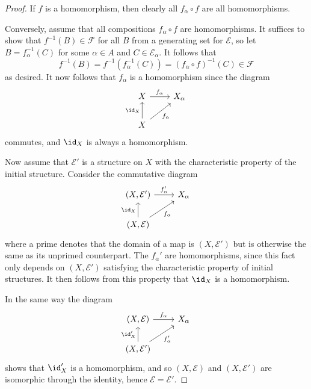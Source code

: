 \documentclass[article, a4paper, 11pt, oneside]{memoir}
\numberwithin{equation}{chapter}
\newcommand{\calE}{\mathcal{E}}
\newcommand{\calF}{\mathcal{F}}
\begin{document}
\begin{proof}
    If $f$ is a homomorphism, then clearly all $f_\alpha \circ f$ are all homomorphisms.

    Conversely, assume that all compositions $f_\alpha \circ f$ are homomorphisms. It suffices to show that $f^{-1}(B) \in \calF$ for all $B$ from a generating set for $\calE$, so let $B = f_\alpha^{-1}(C)$ for some $\alpha \in A$ and $C \in \calE_\alpha$. It follows that
    \begin{equation*}
        f^{-1}(B)
            = f^{-1}(f_\alpha^{-1}(C))
            = (f_\alpha \circ f)^{-1}(C)
            \in \calF
    \end{equation*}
    as desired. It now follows that $f_\alpha$ is a homomorphism since the diagram
    \begin{equation*}
        \begin{tikzcd}
            X
                \ar[r, "f_\alpha"]
            & X_\alpha \\
            X
                \ar[u, "\id_X"]
                \ar[ur, "f_\alpha", swap]
        \end{tikzcd}
    \end{equation*}
    commutes, and $\id_X$ is always a homomorphism.

    Now assume that $\calE'$ is a structure on $X$ with the characteristic property of the initial structure. Consider the commutative diagram
    \begin{equation*}
        \begin{tikzcd}
            (X,\calE')
                \ar[r, "f_\alpha'"]
            & X_\alpha \\
            (X,\calE)
                \ar[u, "\id_X"]
                \ar[ur, "f_\alpha", swap]
        \end{tikzcd}
    \end{equation*}
    where a prime denotes that the domain of a map is $(X,\calE')$ but is otherwise the same as its unprimed counterpart. The $f_\alpha'$ are homomorphisms, since this fact only depends on $(X,\calE')$ satisfying the characteristic property of initial structures. It then follows from this property that $\id_X$ is a homomorphism.

    In the same way the diagram
    \begin{equation*}
        \begin{tikzcd}
            (X,\calE)
                \ar[r, "f_\alpha"]
            & X_\alpha \\
            (X,\calE')
                \ar[u, "\id_X'"]
                \ar[ur, "f_\alpha'", swap]
        \end{tikzcd}
    \end{equation*}
    shows that $\id_X'$ is a homomorphism, and so $(X,\calE)$ and $(X,\calE')$ are isomorphic through the identity, hence $\calE = \calE'$.
\end{proof}
\end{document}
